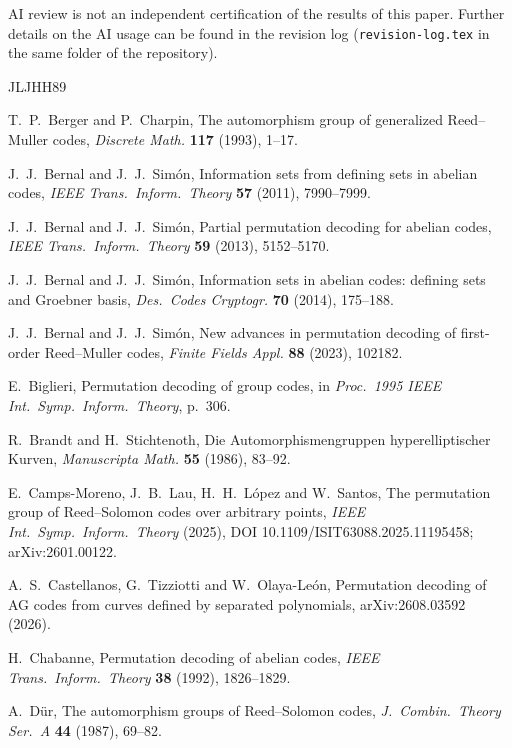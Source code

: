 \documentclass[12pt,letterpaper]{article}
\theoremstyle{definition}
\theoremstyle{remark}
\numberwithin{equation}{section}
\begin{document}
AI review is not an independent certification of the results of this
paper. Further details on the AI usage can be found in the revision log
(\texttt{revision-log.tex} in the same folder of the repository).

\begin{thebibliography}{JLJHH89}\small

 T.~P.~Berger and P.~Charpin, The automorphism group
of generalized Reed--Muller codes, \emph{Discrete Math.} \textbf{117}
(1993), 1--17.

 J.~J.~Bernal and J.~J.~Sim\'on, Information sets
from defining sets in abelian codes, \emph{IEEE Trans.\ Inform.\ Theory}
\textbf{57} (2011), 7990--7999.

 J.~J.~Bernal and J.~J.~Sim\'on, Partial permutation
decoding for abelian codes, \emph{IEEE Trans.\ Inform.\ Theory}
\textbf{59} (2013), 5152--5170.

 J.~J.~Bernal and J.~J.~Sim\'on, Information sets in
abelian codes: defining sets and Groebner basis, \emph{Des.\ Codes
Cryptogr.} \textbf{70} (2014), 175--188.

 J.~J.~Bernal and J.~J.~Sim\'on, New advances in
permutation decoding of first-order Reed--Muller codes, \emph{Finite
Fields Appl.} \textbf{88} (2023), 102182.

 E.~Biglieri, Permutation decoding of group codes,
in \emph{Proc.\ 1995 IEEE Int.\ Symp.\ Inform.\ Theory}, p.~306.

 R.~Brandt and H.~Stichtenoth, Die
Automorphismengruppen hyperelliptischer Kurven, \emph{Manuscripta Math.}
\textbf{55} (1986), 83--92.

 E.~Camps-Moreno, J.~B.~Lau, H.~H.~L\'opez and
W.~Santos, The permutation group of Reed--Solomon codes over arbitrary
points, \emph{IEEE Int.\ Symp.\ Inform.\ Theory} (2025),
DOI 10.1109/ISIT63088.2025.11195458; arXiv:2601.00122.

 A.~S.~Castellanos, G.~Tizziotti and
W.~Olaya-Le\'on, Permutation decoding of AG codes from curves defined by
separated polynomials, arXiv:2608.03592 (2026).

 H.~Chabanne, Permutation decoding of abelian codes,
\emph{IEEE Trans.\ Inform.\ Theory} \textbf{38} (1992), 1826--1829.

 A.~D\"ur, The automorphism groups of
Reed--Solomon codes, \emph{J.\ Combin.\ Theory Ser.~A} \textbf{44}
(1987), 69--82.


\end{thebibliography}
\end{document}
